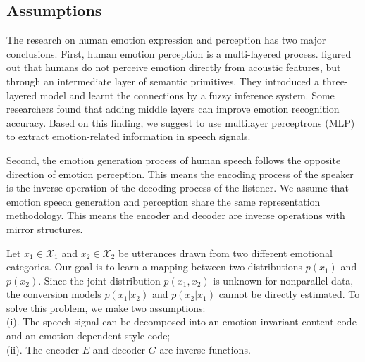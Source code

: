 \documentclass{article}
\begin{document}
\subsection{Assumptions}
The research on human emotion expression and perception has two major conclusions.
First, human emotion perception is a multi-layered process. \cite{huang2008three} figured out that humans do not perceive emotion directly from acoustic features, but through an intermediate layer of semantic primitives. They introduced a three-layered model and learnt the connections by a fuzzy inference system. Some researchers found that adding middle layers can improve emotion recognition accuracy. Based on this finding, we suggest to use multilayer perceptrons (MLP) to extract emotion-related information in speech signals.

Second, the emotion generation process of human speech follows the opposite direction of emotion perception. This means the encoding process of the speaker is the inverse operation of the decoding process of the listener. We assume that emotion speech generation and perception share the same representation methodology. This means the encoder and decoder are inverse operations with mirror structures.

Let $x_1 \in \mathcal{X}_1$ and $x_2 \in \mathcal{X}_2$ be utterances drawn from two different emotional categories. Our goal is to learn a mapping between two distributions $p(x_1)$ and $p(x_2)$. Since the joint distribution $p(x_1, x_2)$ is unknown for nonparallel data, the conversion models $p(x_1|x_2)$ and $p(x_2|x_1)$ cannot be directly estimated. To solve this problem, we make two assumptions: \\
(i). The speech signal can be decomposed into an emotion-invariant content code and an emotion-dependent style code; \\
(ii). The encoder $E$ and decoder $G$ are inverse functions.
\end{document}
